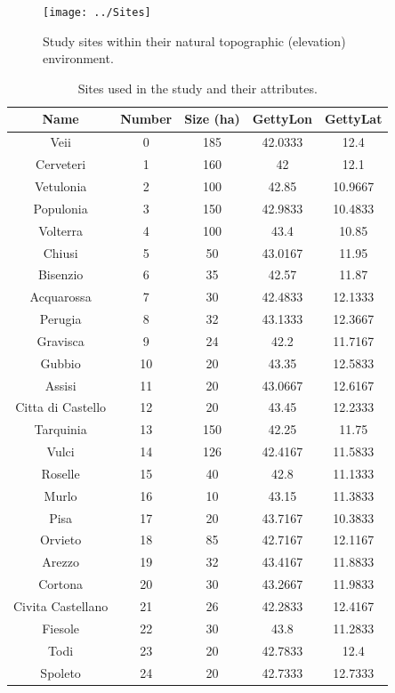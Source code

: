 \documentclass[12pt,a4paper]{thesis}
\begin{document}

\begin{figure}
\centering
\texttt{[image: ../Sites]}
\caption{Study sites within their natural topographic (elevation) environment.}
\label{fig:Sites}
\end{figure}


\begin{table}
\centering
\caption{Sites used in the study and their attributes.}
\begin{tabular}{|c|c|c|c|c|}
\hline \textbf{Name} & \textbf{Number} & \textbf{Size (ha)} & \textbf{GettyLon} & \textbf{GettyLat} \\ 
\hline 	Veii	&	0	&	185	&	42.0333	&	12.4	\\
\hline 	Cerveteri	&	1	&	160	&	42	&	12.1	\\
\hline 	Vetulonia	&	2	&	100	&	42.85	&	10.9667	\\
\hline 	Populonia	&	3	&	150	&	42.9833	&	10.4833	\\
\hline 	Volterra	&	4	&	100	&	43.4	&	10.85	\\
\hline 	Chiusi	&	5	&	50	&	43.0167	&	11.95	\\
\hline 	Bisenzio	&	6	&	35	&	42.57	&	11.87	\\
\hline 	Acquarossa	&	7	&	30	&	42.4833	&	12.1333	\\
\hline 	Perugia	&	8	&	32	&	43.1333	&	12.3667	\\
\hline 	Gravisca	&	9	&	24	&	42.2	&	11.7167	\\
\hline 	Gubbio	&	10	&	20	&	43.35	&	12.5833	\\
\hline 	Assisi	&	11	&	20	&	43.0667	&	12.6167	\\
\hline 	Citta di Castello	&	12	&	20	&	43.45	&	12.2333	\\
\hline 	Tarquinia	&	13	&	150	&	42.25	&	11.75	\\
\hline 	Vulci	&	14	&	126	&	42.4167	&	11.5833	\\
\hline 	Roselle	&	15	&	40	&	42.8	&	11.1333	\\
\hline 	Murlo	&	16	&	10	&	43.15	&	11.3833	\\
\hline 	Pisa	&	17	&	20	&	43.7167	&	10.3833	\\
\hline 	Orvieto	&	18	&	85	&	42.7167	&	12.1167	\\
\hline 	Arezzo	&	19	&	32	&	43.4167	&	11.8833	\\
\hline 	Cortona	&	20	&	30	&	43.2667	&	11.9833	\\
\hline 	Civita Castellano	&	21	&	26	&	42.2833	&	12.4167	\\
\hline 	Fiesole	&	22	&	30	&	43.8	&	11.2833	\\
\hline 	Todi	&	23	&	20	&	42.7833	&	12.4	\\
\hline 	Spoleto	&	24	&	20	&	42.7333	&	12.7333	\\
\hline
\end{tabular} 
\label{tab:SiteData}
\end{table}
\end{document}
